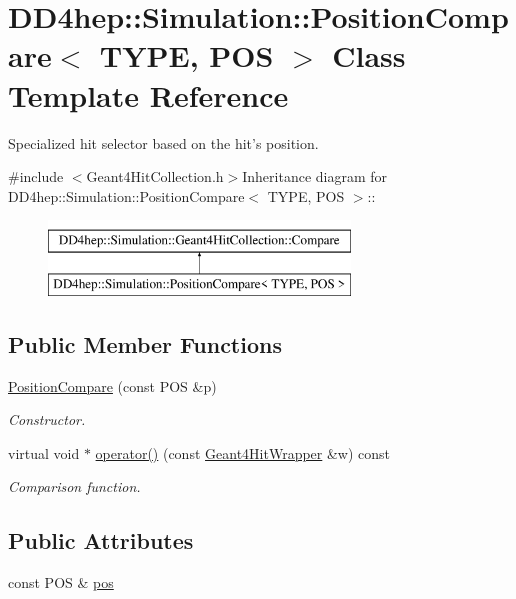 \hypertarget{class_d_d4hep_1_1_simulation_1_1_position_compare}{
\section{DD4hep::Simulation::PositionCompare$<$ TYPE, POS $>$ Class Template Reference}
\label{class_d_d4hep_1_1_simulation_1_1_position_compare}
}


Specialized hit selector based on the hit's position.  


{\ttfamily \#include $<$Geant4HitCollection.h$>$}Inheritance diagram for DD4hep::Simulation::PositionCompare$<$ TYPE, POS $>$::\begin{figure}[H]
\begin{center}
\leavevmode
\includegraphics[height=2cm]{class_d_d4hep_1_1_simulation_1_1_position_compare}
\end{center}
\end{figure}
\subsection*{Public Member Functions}
\begin{DoxyCompactItemize}
\item 
\hyperlink{class_d_d4hep_1_1_simulation_1_1_position_compare_a68fc69a87bb8ea3da749e17642c7b366}{PositionCompare} (const POS \&p)
\begin{DoxyCompactList}\small\item\em Constructor. \item\end{DoxyCompactList}\item 
virtual void $\ast$ \hyperlink{class_d_d4hep_1_1_simulation_1_1_position_compare_a73ccac6277f2059df586125061ccce41}{operator()} (const \hyperlink{class_d_d4hep_1_1_simulation_1_1_geant4_hit_wrapper}{Geant4HitWrapper} \&w) const 
\begin{DoxyCompactList}\small\item\em Comparison function. \item\end{DoxyCompactList}\end{DoxyCompactItemize}
\subsection*{Public Attributes}
\begin{DoxyCompactItemize}
\item 
const POS \& \hyperlink{class_d_d4hep_1_1_simulation_1_1_position_compare_a2a70dd5d725fc539d889a033a51ad038}{pos}
\end{DoxyCompactItemize}



